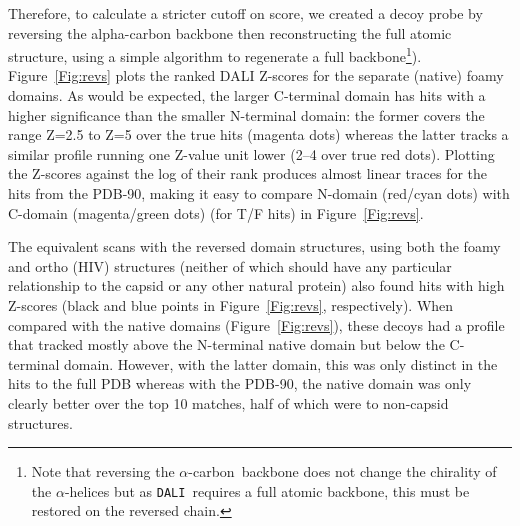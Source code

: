 \documentclass[12pt]{article}
\newcommand{\Fig}[1]{Figure~\ref{Fig:#1}}
\newcommand{\CA}{$\alpha$-carbon}
\newcommand{\A}{$\alpha$}
\newcommand{\3}{$3_{10}$}
\newcommand{\DALI}{{\tt DALI}}
\begin{document}
Therefore, to calculate a stricter cutoff on score, we created a decoy probe by reversing the
alpha-carbon backbone then reconstructing the full atomic structure, using a simple algorithm
to regenerate a full backbone\footnote{
Note that reversing the \CA\ backbone does not change the chirality of the \A-helices
but as \DALI\ requires a full atomic backbone, this must be restored on the reversed chain.
}).
\Fig{revs} plots the ranked DALI Z-scores for the separate (native) foamy domains.
As would be expected, the larger C-terminal domain has hits with a higher significance than the
smaller N-terminal domain:  the former covers the range Z=2.5 to Z=5 over the true hits (magenta
dots) whereas the latter tracks a similar profile running one Z-value unit lower (2--4 over true
red dots).  Plotting the Z-scores against the log of their rank produces almost linear traces
for the hits from the PDB-90, making it easy to compare N-domain (red/cyan dots) with C-domain 
(magenta/green dots) (for T/F hits) in \Fig{revs}.

The equivalent scans with the reversed domain structures, using both the foamy and ortho (HIV) structures 
(neither of which should have any particular relationship to the capsid or any other natural protein)
also found hits with high Z-scores (black and blue points in \Fig{revs}, respectively).
When compared with the native domains (\Fig{revs}), these decoys had a profile that tracked mostly above
the N-terminal native domain but below the C-terminal domain.  However, with the latter domain, this
was only distinct in the hits to the full PDB whereas with the PDB-90, the native domain was only clearly 
better over the top 10 matches, half of which were to non-capsid structures.

 
\end{document}

